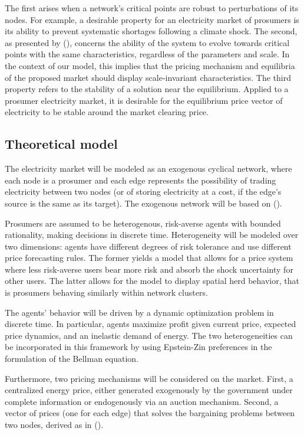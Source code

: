 \documentclass[american]{scrartcl}
\begin{document}
The first arises when a network's critical points are robust to perturbations of its nodes. For example, a desirable property for an electricity market of prosumers is its ability to prevent systematic shortages following a climate shock. The second, as presented by \citeauthor{Bak1995} (\citeyear{Bak1995}), concerns the ability of the system to evolve towards critical points with the same characteristics, regardless of the parameters and scale. In the context of our model, this implies that the pricing mechanism and equilibria of the proposed market should display scale-invariant characteristics. The third property refers to the stability of a solution near the equilibrium. Applied to a prosumer electricity market, it is desirable for the equilibrium price vector of electricity to be stable around the market clearing price. %

\subsection{Theoretical model}

The electricity market will be modeled as an exogenous cyclical network, where each node is a prosumer and each edge represents the possibility of trading electricity between two nodes (or of storing electricity at a cost, if the edge's source is the same as its target). The exogenous network will be based on \citeauthor{Brown2019} (\citeyear{Brown2019}).

Prosumers are assumed to be heterogenous, risk-averse agents with bounded rationality, making decisions in discrete time. Heterogeneity will be modeled over two dimensions: agents have different degrees of risk tolerance and use different price forecasting rules. The former yields a model that allows for a price system where less risk-averse users bear more risk and absorb the shock uncertainty for other users. The latter allows for the model to display spatial herd behavior, that is prosumers behaving similarly within network clusters. %

The agents' behavior will be driven by a dynamic optimization problem in discrete time. In particular, agents maximize profit given current price, expected price dynamics, and an inelastic demand of energy. The two heterogeneities can be incorporated in this framework by using Epstein-Zin preferences in the formulation of the Bellman equation.

Furthermore, two pricing mechanisms will be considered on the market. First, a centralized energy price, either generated exogenously by the government under complete information or endogenously via an auction mechanism. Second, a vector of prices (one for each edge) that solves the bargaining problems between two nodes, derived as in \citeauthor{Bedayo2016} (\citeyear{Bedayo2016}). %
\end{document}
